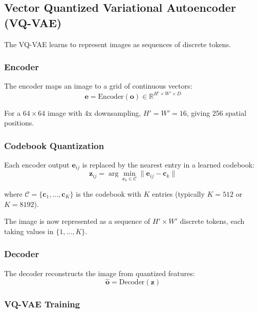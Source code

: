 \subsection{Vector Quantized Variational Autoencoder (VQ-VAE)}

The VQ-VAE learns to represent images as sequences of discrete tokens.

\subsubsection{Encoder}

The encoder maps an image to a grid of continuous vectors:
\begin{equation}
\mathbf{e} = \text{Encoder}(\mathbf{o}) \in \mathbb{R}^{H' \times W' \times D}
\end{equation}

For a $64 \times 64$ image with 4x downsampling, $H' = W' = 16$, giving 256 spatial positions.

\subsubsection{Codebook Quantization}

Each encoder output $\mathbf{e}_{ij}$ is replaced by the nearest entry in a learned codebook:
\begin{equation}
\mathbf{z}_{ij} = \arg\min_{\mathbf{c}_k \in \mathcal{C}} \| \mathbf{e}_{ij} - \mathbf{c}_k \|
\end{equation}

where $\mathcal{C} = \{\mathbf{c}_1, \ldots, \mathbf{c}_K\}$ is the codebook with $K$ entries (typically $K = 512$ or $K = 8192$).

The image is now represented as a sequence of $H' \times W'$ discrete tokens, each taking values in $\{1, \ldots, K\}$.

\subsubsection{Decoder}

The decoder reconstructs the image from quantized features:
\begin{equation}
\hat{\mathbf{o}} = \text{Decoder}(\mathbf{z})
\end{equation}

\subsubsection{VQ-VAE Training}

